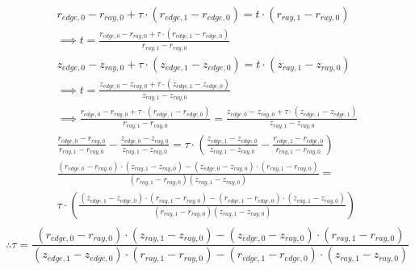 \documentclass{article}
\begin{document}
\begin{align*}
	r_{edge, 0} - r_{ray, 0} + \tau\cdot(r_{edge, 1} - r_{edge, 0}) = t\cdot (r_{ray, 1} - r_{ray, 0})                                                                                                                                                               \\
	\implies t = \frac{ r_{edge, 0} - r_{ray, 0} + \tau\cdot(r_{edge, 1} - r_{edge, 0})}{r_{ray, 1} - r_{ray, 0}}                                                                                                                                                    \\
	z_{edge, 0} - z_{ray, 0} + \tau\cdot(z_{edge, 1} - z_{edge, 0}) = t\cdot (z_{ray, 1} - z_{ray, 0})                                                                                                                                                               \\
	\implies t = \frac{ z_{edge, 0} - z_{ray, 0} + \tau\cdot(z_{edge, 1} - z_{edge, 0})}{z_{ray, 1} - z_{ray, 0}}                                                                                                                                                    \\
	\implies  \frac{ r_{edge, 0} - r_{ray, 0} + \tau\cdot(r_{edge, 1} - r_{edge, 0})}{r_{ray, 1} - r_{ray, 0}} = \frac{ z_{edge, 0} - z_{ray, 0} + \tau\cdot(z_{edge, 1} - z_{edge, 1})}{z_{ray, 1} - z_{ray, 0}}                                                    \\
	\frac{r_{edge, 0} - r_{ray, 0}}{r_{ray, 1} - r_{ray, 0}} - \frac{z_{edge, 0} - z_{ray, 0}}{z_{ray, 1} -z_{ray, 0}} = \tau\cdot\left(\frac{z_{edge, 1} - z_{edge, 0}}{z_{ray, 1} - z_{ray, 0}} - \frac{r_{edge, 1} - r_{edge, 0}}{r_{ray, 1} - r_{ray, 0}}\right) \\
	\frac{(r_{edge, 0} - r_{ray, 0})\cdot(z_{ray, 1} - z_{ray, 0}) - (z_{edge, 0} - z_{ray, 0})\cdot(r_{ray, 1} - r_{ray, 0})}{(r_{ray, 1} - r_{ray, 0})(z_{ray, 1} - z_{ray, 0})} =                                                                                 \\ \tau\cdot\left(\frac{(z_{edge, 1} - z_{edge, 0})\cdot(r_{ray, 1} - r_{ray, 0}) - (r_{edge, 1} - r_{edge, 0})\cdot(z_{ray, 1} - z_{ray, 0})}{(r_{ray, 1} - r_{ray, 0})(z_{ray, 1} - z_{ray, 0})}\right) \\
\end{align*}
\begin{equation}
	\label{eq:edge_dist}
	\therefore \tau = \frac{(r_{edge, 0} - r_{ray, 0})\cdot(z_{ray, 1} - z_{ray, 0}) - (z_{edge, 0} - z_{ray, 0})\cdot(r_{ray, 1} - r_{ray, 0})}{(z_{edge, 1} - z_{edge, 0})\cdot(r_{ray, 1} - r_{ray, 0}) - (r_{edge, 1} - r_{edge, 0})\cdot(z_{ray, 1} - z_{ray, 0})}
\end{equation}
\end{document}

